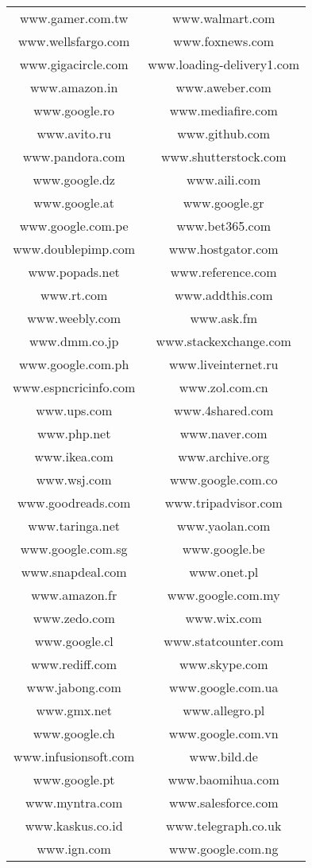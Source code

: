 \begin{longtable}{c c}
www.gamer.com.tw & www.walmart.com \\
www.wellsfargo.com & www.foxnews.com \\
www.gigacircle.com & www.loading-delivery1.com \\
www.amazon.in & www.aweber.com \\
www.google.ro & www.mediafire.com \\
www.avito.ru & www.github.com \\
www.pandora.com & www.shutterstock.com \\
www.google.dz & www.aili.com \\
www.google.at & www.google.gr \\
www.google.com.pe & www.bet365.com \\
www.doublepimp.com & www.hostgator.com \\
www.popads.net & www.reference.com \\
www.rt.com & www.addthis.com \\
www.weebly.com & www.ask.fm \\
www.dmm.co.jp & www.stackexchange.com \\
www.google.com.ph & www.liveinternet.ru \\
www.espncricinfo.com & www.zol.com.cn \\
www.ups.com & www.4shared.com \\
www.php.net & www.naver.com \\
www.ikea.com & www.archive.org \\
www.wsj.com & www.google.com.co \\
www.goodreads.com & www.tripadvisor.com \\
www.taringa.net & www.yaolan.com \\
www.google.com.sg & www.google.be \\
www.snapdeal.com & www.onet.pl \\
www.amazon.fr & www.google.com.my \\
www.zedo.com & www.wix.com \\
www.google.cl & www.statcounter.com \\
www.rediff.com & www.skype.com \\
www.jabong.com & www.google.com.ua \\
www.gmx.net & www.allegro.pl \\
www.google.ch & www.google.com.vn \\
www.infusionsoft.com & www.bild.de \\
www.google.pt & www.baomihua.com \\
www.myntra.com & www.salesforce.com \\
www.kaskus.co.id & www.telegraph.co.uk \\
www.ign.com & www.google.com.ng \\
\end{longtable}